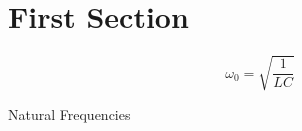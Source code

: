 \documentclass{article}
\begin{document}

\section{First Section}

\begin{equation}
\omega_0 = \sqrt{\frac{1}{LC}}
\end{equation}

Natural Frequencies
\end{document}
